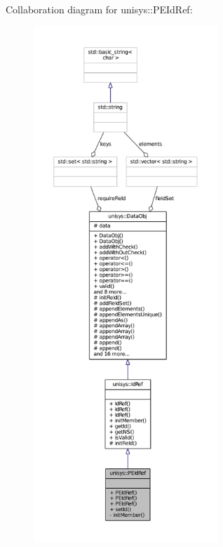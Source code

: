 Collaboration diagram for unisys\-:\-:P\-E\-Id\-Ref\-:
\nopagebreak
\begin{figure}[H]
\begin{center}
\leavevmode
\includegraphics[height=550pt]{classunisys_1_1PEIdRef__coll__graph}
\end{center}
\end{figure}
